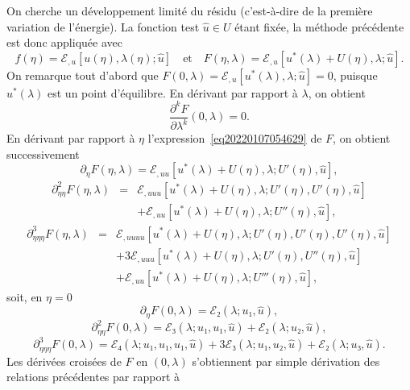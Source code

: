 \documentclass{article}
\begin{document}
On cherche un développement limité du résidu (c'est-à-dire de
la première variation de l'énergie). La fonction test $\hat{u}∈U$
étant fixée, la méthode précédente est donc appliquée
avec
\begin{equation}
  \label{eq20220107054629} f (η) =ℰ_{, u} [u (η), λ
  (η) ; \hat{u}] \quad \text{et} \quad F (η, λ) =ℰ_{, u}
  [u^{\ast} (λ) + U (η), λ ; \hat{u}] .
\end{equation}
On remarque tout d'abord que $F (0, λ) =ℰ_{, u} [u^{\ast}
(λ), λ ; \hat{u}] = 0$, puisque $u^{\ast} (λ)$ est un point
d'équilibre. En dérivant par rapport à $λ$, on obtient
\begin{equation}
  \label{eq20211112164240} \frac{\partial^k F}{\partial λ^k} (0,
  λ) = 0.
\end{equation}
En dérivant par rapport à $η$ l'expression~\eqref{eq20220107054629}
de $F$, on obtient successivement
\begin{equation}
  \partial_{η} F (η, λ) =ℰ_{, u  u} [u^{\ast}
  (λ) + U (η), λ ; U' (η), \hat{u}],
\end{equation}
\begin{eqnarray}
  \partial_{η  η}^2 F (η, λ) & = & ℰ_{, u
   u  u} [u^{\ast} (λ) + U (η), λ ; U' (η),
  U' (η), \hat{u}] \nonumber\\
  &  &  +ℰ_{, u  u} [u^{\ast} (λ) + U
  (η), λ ; U'' (η), \hat{u}],
\end{eqnarray}
\begin{eqnarray}
  \partial_{η  η  η}^3 F (η, λ) & = &
  ℰ_{, u  u  u  u} [u^{\ast} (λ) + U
  (η), λ ; U' (η), U' (η), U' (η), \hat{u}] \nonumber\\
  &  &  + 3ℰ_{, u  u  u} [u^{\ast}
  (λ) + U (η), λ ; U' (η), U'' (η), \hat{u}] \nonumber\\
  &  &  +ℰ_{, u  u} [u^{\ast} (λ) + U
  (η), λ ; U''' (η), \hat{u}],
\end{eqnarray}
soit, en $η = 0$
\begin{equation}
  \partial_{η} F (0, λ) =ℰ₂ (λ ; u₁, \hat{u}),
\end{equation}
\begin{equation}
  \partial_{η  η}^2 F (0, λ) =ℰ₃ (λ ;
  u₁, u₁, \hat{u}) +ℰ₂ (λ ; u₂, \hat{u}),
\end{equation}
\begin{equation}
  \partial_{η  η  η}^3 F (0, λ) =ℰ₄
  (λ ; u₁, u₁, u₁, \hat{u}) + 3ℰ₃ (λ ; u₁, u₂,
  \hat{u}) +ℰ₂ (λ ; u₃, \hat{u}) .
\end{equation}
Les dérivées croisées de $F$ en $(0, λ)$ s'obtiennent par
simple dérivation des relations précédentes par rapport à
\end{document}

